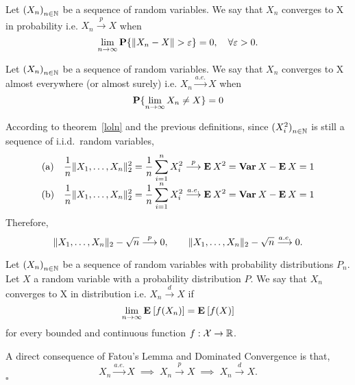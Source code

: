 \begin{definition}
Let ${(X_n)}_{n\in \N}$ be a sequence of random variables. We say that $X_n$ converges to X in probability i.e. $X_n \overset{p}{\to} X$ when
\[ \lim_{n\to\infty} \P\{ \| X_n-X \| > \varepsilon \} = 0,\hspace*{1em} \forall \varepsilon > 0. \]
\end{definition}

\begin{definition}
    Let ${(X_n)}_{n\in \N}$ be a sequence of random variables. We say that $X_n$ converges to X almost everywhere (or almost surely) i.e. $X_n \overset{a.e.}{\to} X$ when
    \[  \P\{ \lim_{n\to\infty} X_n  \neq X \} = 0\]
\end{definition}

According to {theorem}~\ref{loln} and the previous definitions, since ${(X_i^2)}_{n\in\N}$ is still a sequence of i.i.d.~random variables,
\[ \everymath{\displaystyle}
\begin{array}{cc}
    \text{(a)} & \frac{1}{n}\|X_1, \ldots, X_n\|_2^2 = \frac{1}{n} \sum_{i = 1}^n X_i^2 \overset{p}{\longrightarrow} \E X^2 = \Var X - \E X = 1\\
    \text{(b)} & \frac{1}{n}\|X_1, \ldots, X_n\|_2^2 = \frac{1}{n} \sum_{i = 1}^n X_i^2 \overset{a.e.}{\longrightarrow} \E X^2 = \Var X - \E X = 1
\end{array} \]
Therefore,
\[ \|X_1, \ldots, X_n\|_2-\sqrt{n} \overset{p}{\longrightarrow} 0,\hspace*{2em}\|X_1, \ldots, X_n\|_2-\sqrt{n} \overset{a.e.}{\longrightarrow} 0. \]

\begin{definition}
    Let ${(X_n)}_{n\in \N}$ be a sequence of random variables with probability distributions $P_n$. Let $X$ a random variable with a probability distribution $P$. We say that $X_n$ converges to X in distribution i.e. $X_n \overset{d}{\to} X$ if
    \[ \lim_{n\to\infty} \E [f(X_n)] = \E[f(X)]\]
    for every bounded and continuous function $f : \mathcal{X}\to \R$.
\end{definition}

\begin{theorem}
    A direct consequence of Fatou's Lemma and Dominated Convergence is that,
    \[ X_n \overset{a.e.}{\longrightarrow} X \;\implies\; X_n \overset{p}{\longrightarrow} X \;\implies\; X_n \overset{d}{\longrightarrow}  X.\]
    \hfill $\square$
\end{theorem}

